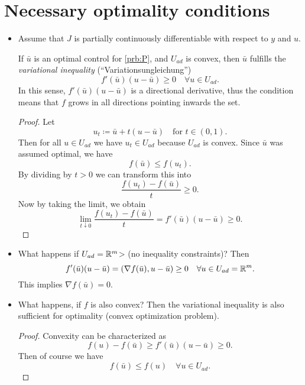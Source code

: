 \documentclass[../skript.tex]{subfiles}
\begin{document}
\section{Necessary optimality conditions}
\begin{itemize}
\item Assume that $J$ is partially continuously differentiable with respect to $y$ and $u$.
\begin{theorem}
If $\bar{u}$ is an optimal control for \cref{prb:P}, and $U_{ad}$ is convex, then $\bar{u}$ fulfills the \emph{variational inequality} (``Variationsungleichung'')
\[
	f'(\bar{u})(u - \bar{u}) \geq 0 \quad \forall u \in U_{ad}.
\]
In this sense, $f'(\bar{u})(u - \bar{u})$ is a directional derivative, thus the condition means that $f$ grows in all directions pointing inwards the set.
\end{theorem}
\begin{proof}
Let
\[
	u_t \coloneqq \bar{u} + t(u - \bar{u}) \quad \text{for } t \in (0, 1).
\]
Then for all $u \in U_{ad}$ we have $u_t \in U_{ad}$ because $U_{ad}$ is convex.
Since $\bar{u}$ was assumed optimal, we have
\[
	f(\bar{u}) \leq f(u_t).
\]
By dividing by $t > 0$ we can transform this into
\[
	\frac{f(u_t) - f(\bar{u})}{t} \geq 0.
\]
Now by taking the limit, we obtain
\[
	\lim_{t \downarrow 0} \frac{f(u_t) - f(\bar{u})}{t} = f'(\bar{u})(u - \bar{u}) \geq 0.
\]
\end{proof}
\item What happens if $U_{ad} = \mathbb{R}^m$> (no inequality constraints)?
Then
\[
	f'(\bar{u})(u - \bar{u}) = (\nabla f(\bar{u}), u - \bar{u}) \geq 0 \quad \forall u \in U_{ad} = \mathbb{R}^m.
\]
This implies $\nabla f(\bar{u}) = 0$.
\item What happens, if $f$ is also convex?
Then the variational inequality is also sufficient for optimality (convex optimization problem).
\begin{proof}
Convexity can be characterized as
\[
	f(u) - f(\bar{u}) \geq f'(\bar{u})(u - \bar{u}) \geq 0.
\]
Then of course we have
\[
	f(\bar{u}) \leq f(u) \quad \forall u \in U_{ad}.
\]
\end{proof}
\end{itemize}
\end{document}
